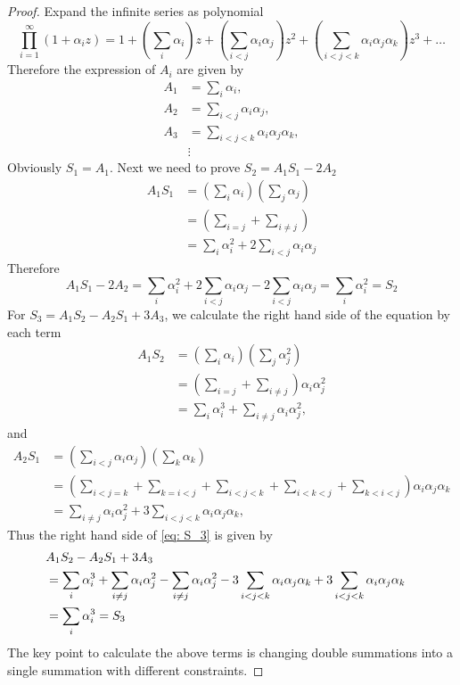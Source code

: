 \documentclass[10pt]{article}
\begin{document}
	\begin{proof}
		Expand the infinite series as polynomial
		\begin{equation}
			\prod_{i=1}^{\infty} (1 + \alpha_i z) = 1 + \left(\sum_i \alpha_i \right) z + \left(\sum_{i < j} \alpha_i \alpha_j \right) z^2 + \left(\sum_{i < j < k} \alpha_i \alpha_j \alpha_k \right) z^3 + \dots
		\end{equation}
		Therefore the expression of $A_i$ are given by
		\begin{align*}
			A_1 &= \sum_i \alpha_i,\\
			A_2 &= \sum_{i < j} \alpha_i \alpha_j, \\
			A_3 &= \sum_{i < j < k} \alpha_i \alpha_j \alpha_k, \\
			&\vdots
		\end{align*}
		Obviously $S_1 = A_1$. Next we need to prove $S_2 = A_1 S_1 - 2 A_2$
		\begin{align*}
			A_1 S_1 &= \left( \sum_i \alpha_i \right) \left( \sum_j \alpha_j \right) \\
			&= \left( \sum_{i=j} + \sum_{i \neq j} \right) \\
			&= \sum_i \alpha_i^2 + 2\sum_{i < j} \alpha_i \alpha_j
		\end{align*}
		Therefore
		\begin{equation}
			A_1 S_1 - 2 A_2 = \sum_i \alpha_i^2 + 2\sum_{i < j} \alpha_i \alpha_j - 2\sum_{i < j} \alpha_i \alpha_j = \sum_i \alpha_i^2 = S_2
		\end{equation}
		For $S_3 = A_1 S_2 - A_2 S_1 + 3 A_3$, we calculate the right hand side of the equation by each term
		\begin{align*}
			A_1 S_2 &= \left( \sum_i \alpha_i \right) \left( \sum_j \alpha_j^2 \right) \\
			&= \left(\sum_{i=j} + \sum_{i \neq j} \right) \alpha_i \alpha_j^2 \\
			&= \sum_i \alpha_i^3 + \sum_{i \neq j} \alpha_i \alpha_j^2,
		\end{align*}
		and
		\begin{align*}
			A_2 S_1 &= \left( \sum_{i < j} \alpha_i \alpha_j \right) \left( \sum_k \alpha_k \right) \\
			&= \left(\sum_{i < j=k} + \sum_{k= i < j} + \sum_{i<j<k} + \sum_{i<k<j} + \sum_{k<i<j}\right) \alpha_i \alpha_j \alpha_k \\
			&= \sum_{i \neq j}\alpha_i \alpha_j^2 + 3 \sum_{i<j<k} \alpha_i \alpha_j \alpha_k,
		\end{align*}
		Thus the right hand side of \eqref{eq: S_3} is given by
		\begin{align*}
			\lefteqn{A_1 S_2 - A_2 S_1 + 3 A_3} \\
			&= \sum_i \alpha_i^3 + \sum_{i \neq j} \alpha_i \alpha_j^2 - \sum_{i \neq j}\alpha_i \alpha_j^2 - 3 \sum_{i<j<k} \alpha_i \alpha_j \alpha_k + 3 \sum_{i<j<k} \alpha_i \alpha_j \alpha_k \\
			&= \sum_i \alpha_i^3 = S_3
		\end{align*}
		The key point to calculate the above terms is changing double summations into a single summation with different constraints.
	\end{proof}
\end{document}
